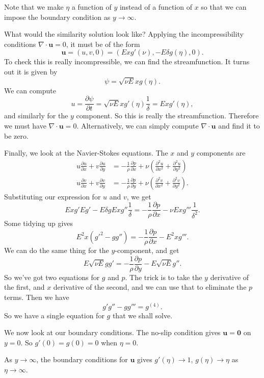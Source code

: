 \documentclass[a4paper]{article}
\begin{document}
\begin{eg}
  Note that we make $\eta$ a function of $y$ instead of a function of $x$ so that we can impose the boundary condition as $y \to \infty$.

  What would the similarity solution look like? Applying the incompressibility conditions $\nabla \cdot \mathbf{u} = 0$, it must be of the form
  \[
    \mathbf{u} = (u, v, 0) = (Ex g'(\nu), -E \delta g(\eta), 0).
  \]
  To check this is really incompressible, we can find the streamfunction. It turns out it is given by
  \[
    \psi = \sqrt{\nu E} x g(\eta).
  \]
  We can compute
  \[
    u = \frac{\partial \psi}{\partial t} = \sqrt{\nu E} x g'(\eta) \frac{1}{\delta} = Ex g'(\eta),
  \]
  and similarly for the $y$ component. So this is really the streamfunction. Therefore we must have $\nabla \cdot \mathbf{u} = 0$. Alternatively, we can simply compute $\nabla \cdot \mathbf{u}$ and find it to be zero.

  Finally, we look at the Navier-Stokes equations. The $x$ and $y$ components are
  \begin{align*}
    u \frac{\partial u}{\partial x} + v \frac{\partial u}{\partial y} &= -\frac{1}{\rho}\frac{\partial p}{\partial x} + \nu \left(\frac{\partial^2 u}{\partial x^2} + \frac{\partial^2 u}{\partial y^2}\right)\\
    u \frac{\partial v}{\partial x} + v \frac{\partial v}{\partial y} &= -\frac{1}{\rho}\frac{\partial p}{\partial y} + \nu \left(\frac{\partial^2 v}{\partial x^2} + \frac{\partial^2 v}{\partial y^2}\right).
  \end{align*}
  Substituting our expression for $u$ and $v$, we get
  \[
    Ex g'E g' - E \delta g E x g'' \frac{1}{\delta} = -\frac{1}{\rho} \frac{\partial p}{\partial x} - \nu E xg''' \frac{1}{\delta^2}.
  \]
  Some tidying up gives
  \[
    E^2 x(g'^2 - gg'') = -\frac{1}{\rho} \frac{\partial p}{\partial x} - E^2 x g'''.
  \]
  We can do the same thing for the $y$-component, and get
  \[
    E\sqrt{\nu E}gg' = -\frac{1}{\rho} \frac{\partial p}{\partial y} - E\sqrt{\nu E}g''.
  \]
  So we've got two equations for $g$ and $p$. The trick is to take the $y$ derivative of the first, and $x$ derivative of the second, and we can use that to eliminate the $p$ terms. Then we have
  \[
    g'g'' - gg''' = g^{(4)}.
  \]
  So we have a single equation for $g$ that we shall solve.

  We now look at our boundary conditions. The no-slip condition gives $\mathbf{u} = \mathbf{0}$ on $y = 0$. So $g'(0) = g(0) = 0$ when $\eta = 0$.

  As $y \to \infty$, the boundary conditions for $\mathbf{u}$ gives $g'(\eta) \to 1$, $g(\eta) \to \eta$ as $\eta \to \infty$.


\end{eg}
\end{document}
